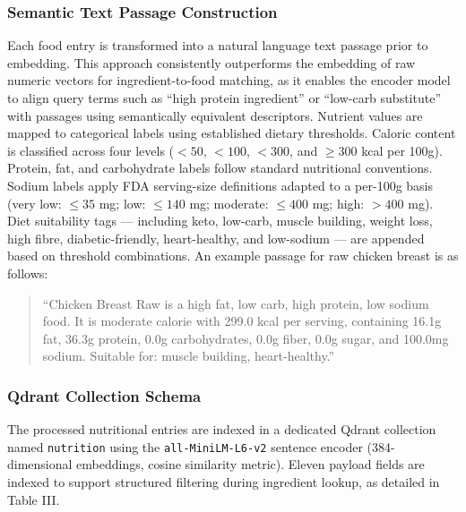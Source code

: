 \documentclass[conference]{IEEEtran}
\begin{document}
\subsubsection{Semantic Text Passage Construction}
Each food entry is transformed into a natural language text passage prior to embedding. This approach consistently outperforms the embedding of raw numeric vectors for ingredient-to-food matching, as it enables the encoder model to align query terms such as ``high protein ingredient'' or ``low-carb substitute'' with passages using semantically equivalent descriptors. Nutrient values are mapped to categorical labels using established dietary thresholds. Caloric content is classified across four levels ($<50$, $<100$, $<300$, and $\geq 300$ kcal per 100g). Protein, fat, and carbohydrate labels follow standard nutritional conventions. Sodium labels apply FDA serving-size definitions adapted to a per-100g basis (very low: $\leq 35$ mg; low: $\leq 140$ mg; moderate: $\leq 400$ mg; high: $>400$ mg). Diet suitability tags --- including keto, low-carb, muscle building, weight loss, high fibre, diabetic-friendly, heart-healthy, and low-sodium --- are appended based on threshold combinations. An example passage for raw chicken breast is as follows:

\begin{quote}
``Chicken Breast Raw is a high fat, low carb, high protein, low sodium food. It is moderate calorie with 299.0 kcal per serving, containing 16.1g fat, 36.3g protein, 0.0g carbohydrates, 0.0g fiber, 0.0g sugar, and 100.0mg sodium. Suitable for: muscle building, heart-healthy.''
\end{quote}

\subsubsection{Qdrant Collection Schema}
The processed nutritional entries are indexed in a dedicated Qdrant collection named \texttt{nutrition} using the \texttt{all-MiniLM-L6-v2} sentence encoder (384-dimensional embeddings, cosine similarity metric). Eleven payload fields are indexed to support structured filtering during ingredient lookup, as detailed in Table III.
\end{document}
